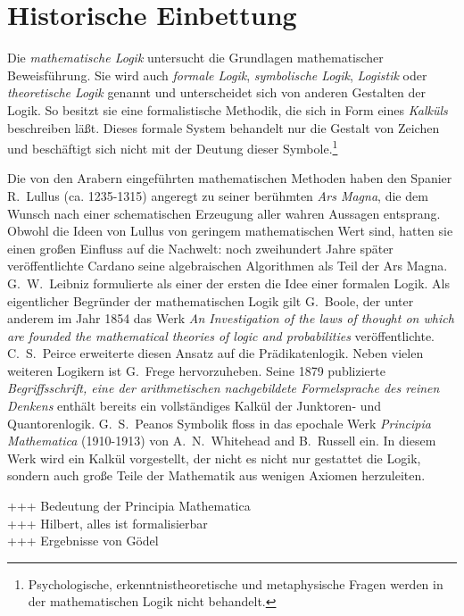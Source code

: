 \documentclass[a4paper,german,10pt,twoside]{book}
\begin{document}
\section*{Historische Einbettung}
Die \emph{mathematische Logik} untersucht die Grundlagen mathematischer Beweisf{\"u}hrung. Sie wird
auch \emph{formale Logik}, \emph{symbolische Logik}, \emph{Logistik} oder \emph{theoretische Logik}
genannt und unterscheidet sich von anderen Gestalten der Logik. So besitzt sie eine formalistische
Methodik, die sich in Form eines \emph{Kalk{\"u}ls} beschreiben l{\"a}{\ss}t. Dieses formale System behandelt
nur die Gestalt von Zeichen und besch{\"a}ftigt sich nicht mit der Deutung dieser
Symbole.\footnote{Psychologische, erkenntnistheoretische und metaphysische Fragen werden in der
mathematischen Logik nicht behandelt.}
\par
Die von den Arabern eingef{\"u}hrten mathematischen Methoden haben den Spanier R.~Lullus (ca.
1235-1315) angeregt zu seiner ber{\"u}hmten \emph{Ars Magna}, die dem Wunsch nach einer schematischen
Erzeugung aller wahren Aussagen entsprang. Obwohl die Ideen von Lullus von geringem mathematischen
Wert sind, hatten sie einen gro{\ss}en Einfluss auf die Nachwelt: noch zweihundert Jahre sp{\"a}ter
ver{\"o}ffentlichte Cardano seine algebraischen Algorithmen als Teil der Ars Magna. G.~W.~Leibniz
formulierte als einer der ersten die Idee einer formalen Logik. Als eigentlicher Begr{\"u}nder der
mathematischen Logik gilt G.~Boole, der unter anderem im Jahr 1854 das Werk \emph{An Investigation
of the laws of thought on which are founded the mathematical theories of logic and probabilities}
ver{\"o}ffentlichte. C.~S.~Peirce erweiterte diesen Ansatz auf die Pr{\"a}dikatenlogik. Neben vielen
weiteren Logikern ist G.~Frege hervorzuheben. Seine 1879 publizierte \emph{Begriffsschrift, eine
der arithmetischen nachgebildete Formelsprache des reinen Denkens} enth{\"a}lt bereits ein
vollst{\"a}ndiges Kalk{\"u}l der Junktoren- und Quantorenlogik. G.~S.~Peanos Symbolik floss in das epochale
Werk \emph{Principia Mathematica} (1910-1913) von A.~N.~Whitehead and
B.~Russell ein. In diesem Werk wird ein Kalk{\"u}l vorgestellt, der nicht es nicht nur gestattet die
Logik, sondern auch gro{\ss}e Teile der Mathematik aus wenigen Axiomen herzuleiten.
\par
+++ Bedeutung der Principia Mathematica \\
+++ Hilbert, alles ist formalisierbar \\
+++ Ergebnisse von G{\"o}del \\
\end{document}
